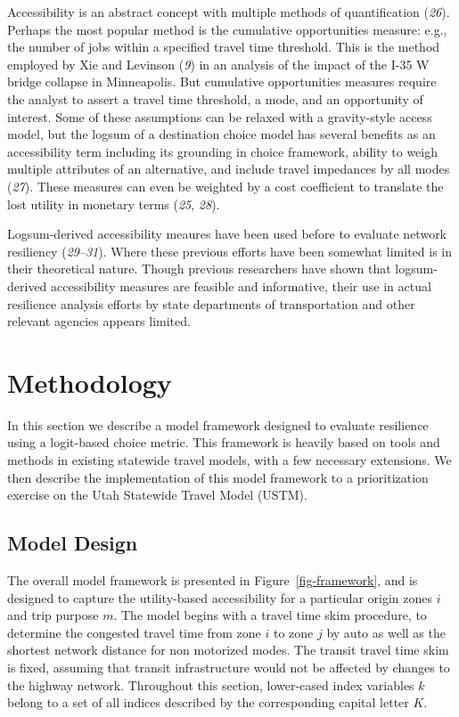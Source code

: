 \documentclass[
  letterpaper,
]{trb}
\begin{document}
Accessibility is an abstract concept with multiple methods of
quantification (\emph{26}). Perhaps the most popular method is the
cumulative opportunities measure: e.g., the number of jobs within a
specified travel time threshold. This is the method employed by Xie and
Levinson (\emph{9}) in an analysis of the impact of the I-35 W bridge
collapse in Minneapolis. But cumulative opportunities measures require
the analyst to assert a travel time threshold, a mode, and an
opportunity of interest. Some of these assumptions can be relaxed with a
gravity-style access model, but the logsum of a destination choice model
has several benefits as an accessibility term including its grounding in
choice framework, ability to weigh multiple attributes of an
alternative, and include travel impedances by all modes (\emph{27}).
These measures can even be weighted by a cost coefficient to translate
the lost utility in monetary terms (\emph{25}, \emph{28}).

Logsum-derived accessibility meaures have been used before to evaluate
network resiliency (\emph{29}--\emph{31}). Where these previous efforts
have been somewhat limited is in their theoretical nature. Though
previous researchers have shown that logsum-derived accessibility
measures are feasible and informative, their use in actual resilience
analysis efforts by state departments of transportation and other
relevant agencies appears limited.


\hypertarget{methodology}{%
\section{Methodology}\label{methodology}}

In this section we describe a model framework designed to evaluate
resilience using a logit-based choice metric. This framework is heavily
based on tools and methods in existing statewide travel models, with a
few necessary extensions. We then describe the implementation of this
model framework to a prioritization exercise on the Utah Statewide
Travel Model (USTM).

\hypertarget{model-design}{%
\subsection{Model Design}\label{model-design}}

The overall model framework is presented in Figure~\ref{fig-framework},
and is designed to capture the utility-based accessibility for a
particular origin zones \(i\) and trip purpose \(m\). The model begins
with a travel time skim procedure, to determine the congested travel
time from zone \(i\) to zone \(j\) by auto as well as the shortest
network distance for non motorized modes. The transit travel time skim
is fixed, assuming that transit infrastructure would not be affected by
changes to the highway network. Throughout this section, lower-cased
index variables \(k\) belong to a set of all indices described by the
corresponding capital letter \(K\).
\end{document}
